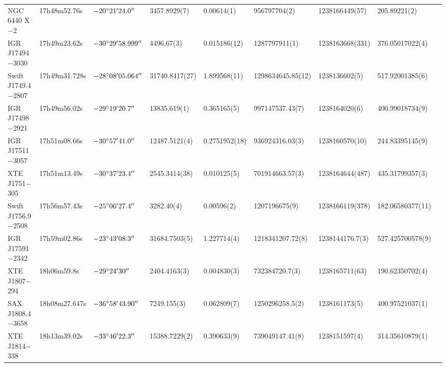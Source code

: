 \begin{landscape}
\begin{table}
{\begin{NiceTabular}{l l l l l l l l l}
NGC 6440 X$-$2       & 17h48m52.76s  & $-20^{\circ}21'24.0''$     & 3457.8929(7)  & 0.00614(1)    & 956797704(2)      & 1238166449(57)      & 205.89221(2)     & \cite{Heinke2010a, Bult2015}  \\
IGR J17494$-$3030	 & 17h49m23.62s  & $-30^{\circ}29'58.999''$   & 4496.67(3)    & 0.015186(12)  & 1287797911(1)     & 1238163668(331)      & 376.05017022(4)  & \cite{Ng2021}   \\
Swift J1749.4$-$2807 & 17h49m31.728s & $-28^{\circ}08'05.064''$   & 31740.8417(27)& 1.899568(11)  & 1298634645.85(12) & 1238136602(5)     & 517.92001385(6) & \cite{Jonker2013, Bult2021a, Sanna2022} \\
IGR J17498$-$2921    & 17h49m56.02s  & $-29^{\circ}19'20.7''$     & 13835.619(1) & 0.365165(5)  & 997147537.43(7)               & 1238164020(6)     & 400.99018734(9) & \cite{Papitto17498, Falanga2012}  \\
IGR J17511$-$3057    & 17h51m08.66s  & $-30^{\circ}57'41.0''$     & 12487.5121(4) & 0.2751952(18) & 936924316.03(3)   & 1238160570(10)      & 244.83395145(9)  & \cite{Paizis2012, Riggio17511} \\
XTE J1751$-$305      & 17h51m13.49s  & $-30^{\circ}37'23.4''$     & 2545.3414(38) & 0.010125(5) & 701914663.57(3)				& 1238164644(487)       & 435.31799357(3)  & \cite{Markwardt1751, Papitto1751} \\
Swift J1756.9$-$2508 & 17h56m57.43s  & $-25^{\circ}06'27.4''$     & 3282.40(4)    & 0.00596(2)    & 1207196675(9)     & 1238166119(378)      & 182.06580377(11) & \cite{Sanna1756}  \\
IGR J17591$-$2342    & 17h59m02.86s  & $-23^{\circ}43'08.3''$     & 31684.7503(5) & 1.227714(4)   & 1218341207.72(8)  & 1238144176.7(3)          & 527.425700578(9) & \cite{Russell2018, Sanna17591} \\
XTE J1807$-$294      & 18h06m59.8s   & $-29^{\circ}24'30''$       & 2404.4163(3)  & 0.004830(3)   & 732384720.7(3)    & 1238165711(63)      & 190.62350702(4)  & \cite{Markwardt1807, Patruno1807}  \\
SAX J1808.4$-$3658   & 18h08m27.647s & $-36^{\circ}58'43.90''$    & 7249.155(3)   & 0.062809(7)   & 1250296258.5(2)   & 1238161173(5)     & 400.97521037(1)  & \cite{Bult2020} \\
XTE J1814$-$338      & 18h13m39.02s  & $-33^{\circ}46'22.3''$     & 15388.7229(2)\hspace{0.5em} & 0.390633(9) & 739049147.41(8) & 1238151597(4)     & 314.35610879(1) & \cite{Krauss2005, Papitto1814}  \\

\end{NiceTabular}}
\end{table}
\end{landscape}
